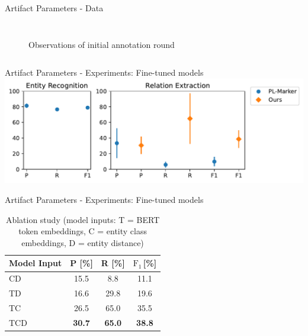 \documentclass[en,16:9,smallfoot]{sdqbeamer}
\begin{document}
\begin{frame}{Artifact Parameters - Data}
\begin{columns}
\begin{figure}
{                }
                \caption{Observations of initial annotation round}
                \label{fig:init-annot}
            \end{figure}
   \end{columns}
   \end{frame}


   \begin{frame}{Artifact Parameters - Experiments: Fine-tuned models}
           \centering\includegraphics[width=0.7\linewidth]{imgs/fine_tuned_eval}
   \end{frame}

   \begin{frame}{Artifact Parameters - Experiments: Fine-tuned models}
        \begin{table}
          \centering
          \caption[Ablation study]{Ablation study (model inputs: T = BERT token embeddings, C = entity class embeddings, D = entity distance)}
          \label{tab:finetunedablation}
          \begin{tabular}{lccc}
            \hline
            Model Input & P [\%] & R [\%] & $\text{F}_1$\,[\%] \\
            \hline
            \textvisiblespace CD & 15.5 & 8.8 & 11.1 \\
            T\textvisiblespace D & 16.6 & 29.8 & 19.6 \\
            TC\textvisiblespace & 26.5 & 65.0 & 35.5 \\
            TCD & \textbf{30.7} & \textbf{65.0} & \textbf{38.8} \\
            \hline
          \end{tabular}
        \end{table}
   \end{frame}
\end{document}
